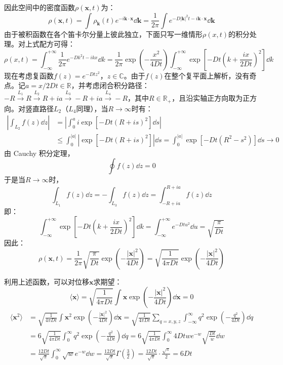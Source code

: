 因此空间中的密度函数$\rho(\mathbf{x},t)$为：
\[\rho(\mathbf{x},t)=\int\rho_{\mathbf{k}}(t)e^{-i\mathbf{k}\cdot\mathbf{x}}\dd{\mathbf{k}}=\frac{1}{2\pi}\int e^{-D|\mathbf{k}|^2t-i\mathbf{k}\cdot\mathbf{x}}\dd{\mathbf{k}}\]
由于被积函数在各个笛卡尔分量上彼此独立，下面只写一维情形$\rho(x,t)$的积分处理。对上式配方可得：
\[\rho(x,t)=\int_{-\infty}^{+\infty}\frac{1}{2\pi}e^{-Dk^2t-ikx}\dd{k}=\frac{1}{2\pi}\exp\left(-\frac{x^2}{4Dt}\right)\int_{-\infty}^{+\infty}\exp\left[-Dt\left(k+\frac{ix}{2Dt}\right)^2\right]\dd{k}\]
现在考虑复函数$f(z)=e^{-Dtz^2}$，$z\in\mathbb{C}$。由于$f(z)$在整个复平面上解析，没有奇点。记$a=x/2Dt\in\mathbb{R}$，并考虑闭合积分路径：$-R \xrightarrow{L_1} R \xrightarrow{L_2} R+ia \xrightarrow{L_3} -R+ia \xrightarrow{L_4} -R$，其中$ R\in\mathbb{R}_+$，且沿实轴正方向取为正方向。对竖直路径$L_2$（$L_4$同理），当$R\to\infty$时有：
\[\begin{aligned}
\left|\int_{L_2}f(z)\dd{z}\right|
&=\left|\int_0^{a}i\exp\left[-Dt(R+is)^2\right]\dd{s}\right|\\
&\leq \int_0^{|a|}\left|\exp\left[-Dt(R+is)^2\right]\right|\dd{s}=\int_0^{|a|}\exp\left[-Dt(R^2-s^2)\right]\dd{s}\to 0
\end{aligned}\]
由 Cauchy 积分定理，
\[\oint f(z)\dd{z}=0\]
于是当$R\to\infty$时，
\[\int_{L_1}f(z)\dd{z}=-\int_{L_3}f(z)\dd{z}=\int_{-R+ia}^{R+ia}f(z)\dd{z}\]
即：
\[\int_{-\infty}^{+\infty}\exp\left[-Dt\left(k+\frac{ix}{2Dt}\right)^2\right]\dd{k}=\int_{-\infty}^{+\infty}e^{-Dtu^2}\dd{u}=\sqrt{\frac{\pi}{Dt}}\]
因此：
\[\rho(\mathbf{x},t)=\frac{1}{2\pi}\sqrt{\frac{\pi}{Dt}}\exp\left(-\frac{|\mathbf{x}|^2}{4Dt}\right)=\sqrt{\frac{1}{4\pi Dt}}\exp\left(-\frac{|\mathbf{x}|^2}{4Dt}\right)\]

利用上述函数，可以对位移$\mathbf{x}$求期望：
\[\langle \mathbf{x} \rangle=\sqrt{\frac{1}{4\pi Dt}}\int\mathbf{x}\exp\left(-\frac{|\mathbf{x}|^2}{4Dt}\right)\dd{\mathbf{x}}=0\]
\[\begin{aligned}
\langle \mathbf{x}^2 \rangle&=\sqrt{\frac{1}{4\pi Dt}}\int\mathbf{x}^2\exp\left(-\frac{|\mathbf{x}|^2}{4Dt}\right)\dd{\mathbf{x}}=\sqrt{\frac{1}{4\pi Dt}}\sum_{q=x,y,z}\int_{-\infty}^{\infty} q^2\exp\left(-\frac{q^2}{4Dt}\right)\dd{q}\\
&=6\sqrt{\frac{1}{4\pi Dt}}\int_0^{\infty} q^2\exp\left(-\frac{q^2}{4Dt}\right)\dd{q}=6\sqrt{\frac{1}{4\pi Dt}}\int_0^{\infty} 4Dtwe^{-w}\sqrt{\frac{Dt}{w}}\dd{w}\\
&=\frac{12Dt}{\sqrt{\pi}}\int_0^{\infty} \sqrt{w}e^{-w}\dd{w}=\frac{12Dt}{\sqrt{\pi}}\Gamma\left(\frac{3}{2}\right)=\frac{12Dt}{\sqrt{\pi}}\cdot\frac{\sqrt{\pi}}{2}=6Dt
\end{aligned}\]

